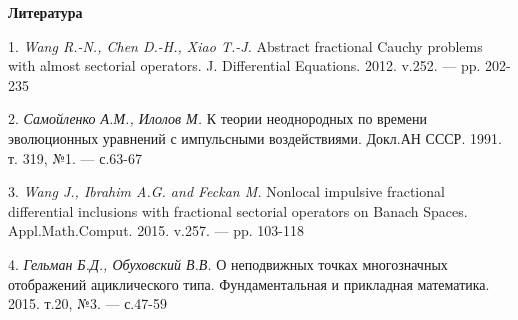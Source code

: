 \smallskip \centerline {\bf Литература} \nopagebreak

1. {\it Wang R.-N., Chen D.-H., Xiao T.-J.} Abstract fractional Cauchy problems with almost sectorial operators. J. Differential Equations. 2012. v.252. — pp. 202-235

2. {\it Самойленко А.М., Илолов М.} К теории неоднородных по времени эволюционных уравнений с импульсными воздействиями. Докл.АН СССР. 1991. т. 319, №1. — с.63-67

3. {\it Wang J., Ibrahim A.G. and Feckan M.} Nonlocal impulsive fractional differential inclusions with fractional sectorial operators on Banach Spaces. Appl.Math.Comput. 2015. v.257. — pp. 103-118

4. {\it Гельман Б.Д., Обуховский В.В.} О неподвижных точках многозначных отображений ациклического типа. Фундаментальная и прикладная математика. 2015. т.20, №3. — с.47-59
